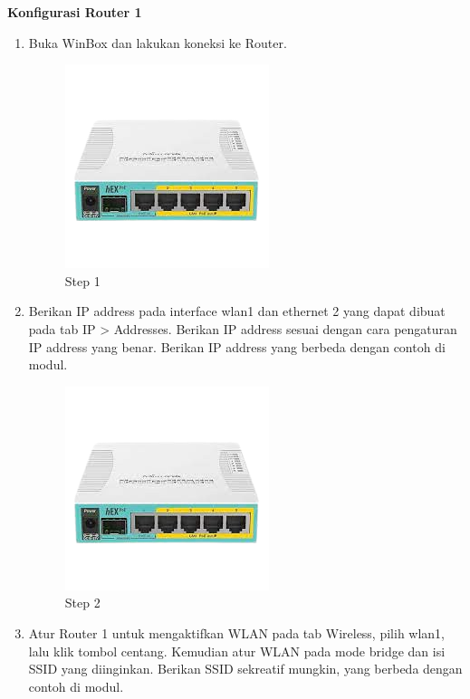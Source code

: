 \begin{center} 
	\textbf{Konfigurasi Router 1}
\end{center}

\begin{enumerate}
	\item Buka WinBox dan lakukan koneksi ke Router.
	\begin{figure}[H]
		\centering
		\includegraphics[width=0.5\linewidth]{P1/img/contoh.png}
		\caption{Step 1}
		\label{fig:gambar16}
	\end{figure}

	\item Berikan IP address pada interface wlan1 dan ethernet 2 yang dapat dibuat pada tab IP > Addresses. Berikan IP address sesuai dengan cara pengaturan IP address yang benar. Berikan IP
	address yang berbeda dengan contoh di modul.
	\begin{figure}[H]
		\centering
		\includegraphics[width=0.5\linewidth]{P1/img/contoh.png}
		\caption{Step 2}
		\label{fig:gambar17}
	\end{figure}

	\item Atur Router 1 untuk mengaktifkan WLAN pada tab Wireless, pilih wlan1, lalu klik tombol centang.
	Kemudian atur WLAN pada mode bridge dan isi SSID yang diinginkan. Berikan SSID sekreatif
	mungkin, yang berbeda dengan contoh di modul.
	

\end{enumerate}
